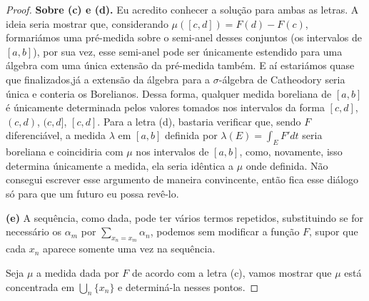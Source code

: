 \begin{proof}
    \textbf{Sobre (c) e (d).} Eu acredito conhecer a solução para ambas as letras. A ideia seria mostrar que, considerando $\mu([c,d]) = F(d) - F(c)$, formariámos
    uma pré-medida sobre o semi-anel desses conjuntos (os intervalos de $[a,b]$), por sua vez, esse semi-anel pode ser únicamente estendido para uma álgebra com 
    uma única extensão da pré-medida também. E aí estariámos quase que finalizados,já  a extensão da álgebra para a $\sigma$-álgebra de Catheodory seria única e 
    conteria os Borelianos. Dessa forma, qualquer medida boreliana de $[a,b]$ é únicamente determinada pelos valores tomados nos intervalos da forma $[c,d]$, $(c,d)$, $(c,d]$, $[c,d]$.
    Para a letra (d), bastaria verificar que, sendo $F$ diferenciável, a medida $\lambda$ em $[a,b]$ definida por $\lambda(E) = \int_E F'dt$ seria boreliana e 
    coincidiria com $\mu$ nos intervalos de $[a,b]$, como, novamente, isso determina únicamente a medida, ela seria idêntica a $\mu$ onde definida. Não consegui escrever 
    esse argumento de maneira convincente, então fica esse diálogo só para que um futuro eu possa revê-lo.


    \textbf{(e)} A sequência, como dada, pode ter vários termos repetidos,
    substituindo se for necessário os $\alpha_m$ por $\sum_{x_n = x_m}{\alpha_n}$, podemos sem modificar a função $F$, supor 
    que cada $x_n$ aparece somente uma vez na sequência.
    
    Seja $\mu$ a medida dada por $F$ de acordo com a letra (c), vamos mostrar 
    que $\mu$ está concentrada em $\bigcup_n\{x_n\}$ e determiná-la nesses pontos. 
    

\end{proof}

